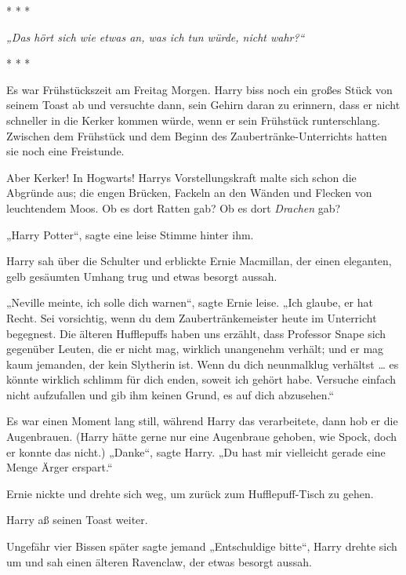 

\hypertarget{hackordnung}{%

* * *

\emph{„Das hört sich wie etwas an, was ich tun würde, nicht wahr?“}

* * *

Es war Frühstückszeit am Freitag Morgen. Harry biss noch ein großes Stück von seinem Toast ab und versuchte dann, sein Gehirn daran zu erinnern, dass er nicht schneller in die Kerker kommen würde, wenn er sein Frühstück runterschlang. Zwischen dem Frühstück und dem Beginn des Zaubertränke-Unterrichts hatten sie noch eine Freistunde.

Aber Kerker! In Hogwarts! Harrys Vorstellungskraft malte sich schon die Abgründe aus; die engen Brücken, Fackeln an den Wänden und Flecken von leuchtendem Moos. Ob es dort Ratten gab? Ob es dort \emph{Drachen} gab?

„Harry Potter“, sagte eine leise Stimme hinter ihm.

Harry sah über die Schulter und erblickte Ernie Macmillan, der einen eleganten, gelb gesäumten Umhang trug und etwas besorgt aussah.

„Neville meinte, ich solle dich warnen“, sagte Ernie leise. „Ich glaube, er hat Recht. Sei vorsichtig, wenn du dem Zaubertränkemeister heute im Unterricht begegnest. Die älteren Hufflepuffs haben uns erzählt, dass Professor Snape sich gegenüber Leuten, die er nicht mag, wirklich unangenehm verhält; und er mag kaum jemanden, der kein Slytherin ist. Wenn du dich neunmalklug verhältst … es könnte wirklich schlimm für dich enden, soweit ich gehört habe. Versuche einfach nicht aufzufallen und gib ihm keinen Grund, es auf dich abzusehen.“

Es war einen Moment lang still, während Harry das verarbeitete, dann hob er die Augenbrauen. (Harry hätte gerne nur eine Augenbraue gehoben, wie Spock, doch er konnte das nicht.) „Danke“, sagte Harry. „Du hast mir vielleicht gerade eine Menge Ärger erspart.“

Ernie nickte und drehte sich weg, um zurück zum Hufflepuff-Tisch zu gehen.

Harry aß seinen Toast weiter.

Ungefähr vier Bissen später sagte jemand „Entschuldige bitte“, Harry drehte sich um und sah einen älteren Ravenclaw, der etwas besorgt aussah.

}
